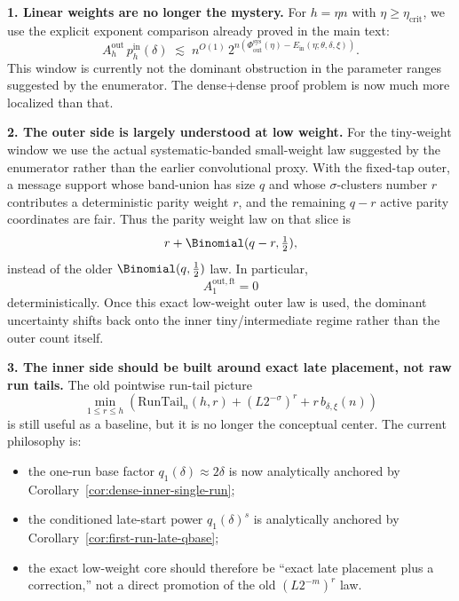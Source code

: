 \medskip
\noindent
\textbf{1. Linear weights are no longer the mystery.}
For \(h=\eta n\) with \(\eta\ge \eta_{\mathrm{crit}}\), we use the explicit exponent comparison already proved in the
main text:
\[
A_h^{\mathrm{out}}\,p_h^{\mathrm{in}}(\delta)
\;\lesssim\;
n^{O(1)}\,2^{n(\Phi_{\mathrm{out}}^{\mathrm{sys}}(\eta)-E_{\mathrm{in}}(\eta;\theta,\delta,\xi))}.
\]
This window is currently not the dominant obstruction in the parameter ranges suggested by the enumerator.
The dense+dense proof problem is now much more localized than that.

\medskip
\noindent
\textbf{2. The outer side is largely understood at low weight.}
For the tiny-weight window we use the actual systematic-banded small-weight law suggested by the enumerator rather than
the earlier convolutional proxy. With the fixed-tap outer, a message support whose band-union has size \(q\) and whose
\(\sigma\)-clusters number \(r\) contributes a deterministic parity weight \(r\), and the remaining \(q-r\) active
parity coordinates are fair. Thus the parity weight law on that slice is
\[
r+\Binomial(q-r,\tfrac12),
\]
instead of the older \(\Binomial(q,\tfrac12)\) law. In particular,
\begin{equation}
\label{eq:dense-dense-working-outer-small}
A_1^{\mathrm{out,ft}}=0
\end{equation}
deterministically. Once this exact low-weight outer law is used, the dominant uncertainty shifts back onto the inner
tiny/intermediate regime rather than the outer count itself.

\medskip
\noindent
\textbf{3. The inner side should be built around exact late placement, not raw run tails.}
The old pointwise run-tail picture
\[
\min_{1\le r\le h}
\left(
\mathrm{RunTail}_n(h,r)+(L2^{-\sigma})^r+r\,b_{\delta,\xi}(n)
\right)
\]
is still useful as a baseline, but it is no longer the conceptual center.
The current philosophy is:
\begin{itemize}
\item the one-run base factor \(q_1(\delta)\approx 2\delta\) is now analytically anchored by
Corollary~\ref{cor:dense-inner-single-run};
\item the conditioned late-start power \(q_1(\delta)^s\) is analytically anchored by
Corollary~\ref{cor:first-run-late-qbase};
\item the exact low-weight core should therefore be ``exact late placement plus a correction,'' not a direct promotion
of the old \((L2^{-m})^r\) law.
\end{itemize}

